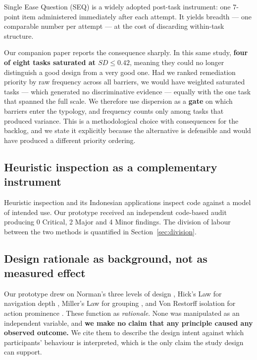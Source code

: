 \documentclass[]{interact}
\theoremstyle{plain}
\begin{document}
Single Ease Question (SEQ) \citep{sauro2016} is a widely adopted post-task instrument: one 7-point item
administered immediately after each attempt. It yields breadth --- one comparable number per attempt
--- at the cost of discarding within-task structure.

Our companion paper \citep{braniwati2026dispersion} reports the consequence sharply. In this same
study, \textbf{four of eight tasks saturated at $SD \leq 0.42$}, meaning they could no longer
distinguish a good design from a very good one. Had we ranked remediation priority by raw frequency
across all barriers, we would have weighted saturated tasks --- which generated no discriminative
evidence --- equally with the one task that spanned the full scale. We therefore use dispersion as a
\textbf{gate} on which barriers enter the typology, and frequency counts only among tasks that produced
variance. This is a methodological choice with consequences for the backlog, and we state it explicitly
because the alternative is defensible and would have produced a different priority ordering.

\subsection{Heuristic inspection as a complementary instrument}

Heuristic inspection \citep{nielsen1994} and its Indonesian applications
\citep{perdanakusuma2022,febriyanthi2021} inspect code against a model of intended use. Our prototype
received an independent code-based audit producing 0 Critical, 2 Major and 4 Minor findings. The
division of labour between the two methods is quantified in Section~\ref{sec:division}.

\subsection{Design rationale as background, not as measured effect}

Our prototype drew on Norman's three levels of design \citep{norman2013}, Hick's Law for navigation
depth \citep{hick1952}, Miller's Law for grouping \citep{miller1956}, and Von Restorff isolation for
action prominence \citep{vonrestorff1933}. These function as \emph{rationale}. None was manipulated as
an independent variable, and \textbf{we make no claim that any principle caused any observed
outcome.} We cite them to describe the design intent against which participants' behaviour is
interpreted, which is the only claim the study design can support.
\end{document}
